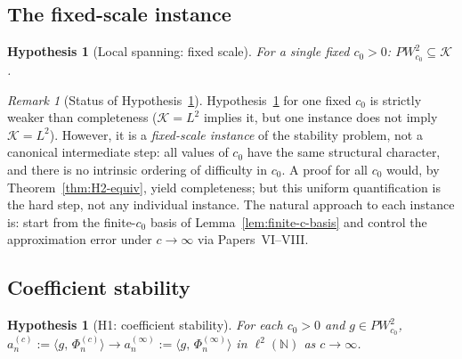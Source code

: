 \documentclass[12pt,a4paper]{amsart}
\newtheorem{hypothesis}[theorem]{Hypothesis}
\theoremstyle{definition}
\theoremstyle{remark}
\newtheorem{remark}[theorem]{Remark}
\newcommand{\ip}[2]{\langle #1,\, #2\rangle}
\newcommand{\Phiinf}[1]{\Phi_{#1}^{(\infty)}}
\newcommand{\Phic}[2]{\Phi_{#2}^{(#1)}}
\newcommand{\PW}{PW}
\newcommand{\Kspace}{\mathcal{K}}
\begin{document}
\subsection{The fixed-scale instance}

\begin{hypothesis}[Local spanning: fixed scale]
\label{hyp:local-span}
For a single fixed $c_0 > 0$:
$\PW_{c_0}^2 \subseteq \Kspace$.
\end{hypothesis}

\begin{remark}[Status of Hypothesis~\ref{hyp:local-span}]
\label{rem:local-H2-status}
Hypothesis~\ref{hyp:local-span} for one fixed $c_0$
is strictly weaker than completeness
($\Kspace=L^2$ implies it, but one instance does
not imply $\Kspace=L^2$).
However, it is a \emph{fixed-scale instance} of
the stability problem, not a canonical intermediate
step:
all values of $c_0$ have the same structural
character, and there is no intrinsic ordering
of difficulty in $c_0$.
A proof for all $c_0$ would, by
Theorem~\ref{thm:H2-equiv}, yield completeness;
but this uniform quantification is the hard step,
not any individual instance.
The natural approach to each instance is:
start from the finite-$c_0$ basis of
Lemma~\ref{lem:finite-c-basis} and control
the approximation error under $c \to \infty$
via Papers~VI--VIII.
\end{remark}

\subsection{Coefficient stability}

\begin{hypothesis}[H1: coefficient stability]
\label{hyp:coeff-stability}
For each $c_0>0$ and $g\in\PW_{c_0}^2$,
$a_n^{(c)}:=\ip{g}{\Phic{c}{n}}
\to a_n^{(\infty)}:=\ip{g}{\Phiinf{n}}$
in $\ell^2(\mathbb{N})$ as $c\to\infty$.
\end{hypothesis}
\end{document}
